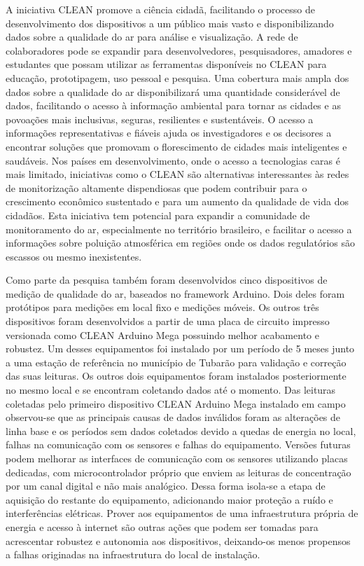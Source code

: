 A iniciativa CLEAN promove a ciência cidadã, facilitando o processo de desenvolvimento dos dispositivos a um público mais vasto e disponibilizando dados sobre a qualidade do ar para análise e visualização. A rede de colaboradores pode se expandir para desenvolvedores, pesquisadores, amadores e estudantes que possam utilizar as ferramentas disponíveis no CLEAN para educação, prototipagem, uso pessoal e pesquisa. Uma cobertura mais ampla dos dados sobre a qualidade do ar disponibilizará uma quantidade considerável de dados, facilitando o acesso à informação ambiental para tornar as cidades e as povoações mais inclusivas, seguras, resilientes e sustentáveis. O acesso a informações representativas e fiáveis ajuda os investigadores e os decisores a encontrar soluções que promovam o florescimento de cidades mais inteligentes e saudáveis. Nos países em desenvolvimento, onde o acesso a tecnologias caras é mais limitado, iniciativas como o CLEAN são alternativas interessantes às redes de monitorização altamente dispendiosas que podem contribuir para o crescimento econômico sustentado e para um aumento da qualidade de vida dos cidadãos. Esta iniciativa tem potencial para expandir a comunidade de monitoramento do ar, especialmente no território brasileiro, e facilitar o acesso a informações sobre poluição atmosférica em regiões onde os dados regulatórios são escassos ou mesmo inexistentes.

Como parte da pesquisa também foram desenvolvidos cinco dispositivos de medição de qualidade do ar, baseados no framework Arduino. Dois deles foram protótipos para medições em local fixo e medições móveis. Os outros três dispositivos foram desenvolvidos a partir de uma placa de circuito impresso versionada como CLEAN Arduino Mega possuindo melhor acabamento e robustez. Um desses equipamentos foi instalado por um período de 5 meses junto a uma estação de referência no município de Tubarão para validação e correção das suas leituras. Os outros dois equipamentos foram instalados posteriormente no mesmo local e se encontram coletando dados até o momento. Das leituras coletadas pelo primeiro dispositivo CLEAN Arduino Mega instalado em campo observou-se que as principais causas de dados inválidos foram as alterações de linha base e os períodos sem dados coletados devido a quedas de energia no local, falhas na comunicação com os sensores e falhas do equipamento. Versões futuras podem melhorar as interfaces de comunicação com os sensores utilizando placas dedicadas, com microcontrolador próprio que enviem as leituras de concentração por um canal digital e não mais analógico. Dessa forma isola-se a etapa de aquisição do restante do equipamento, adicionando maior proteção a ruído e interferências elétricas. Prover aos equipamentos de uma infraestrutura própria de energia e acesso à internet são outras ações que podem ser tomadas para acrescentar robustez e autonomia aos dispositivos, deixando-os menos propensos a falhas originadas na infraestrutura do local de instalação.

